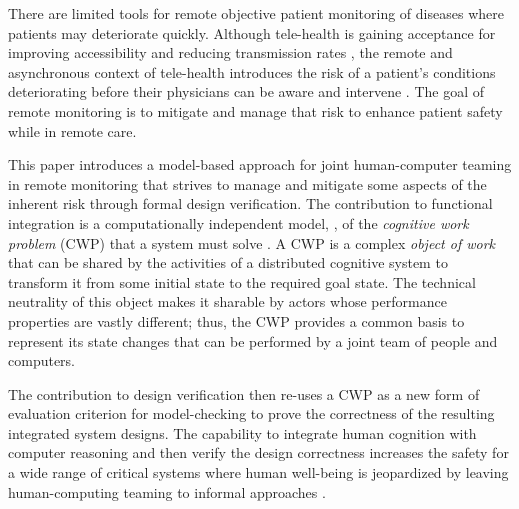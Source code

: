 There are limited tools for remote objective patient monitoring of diseases where patients may deteriorate quickly. Although tele-health is gaining acceptance for improving accessibility and reducing transmission rates \cite{10.1093/jamia/ocaa048,telehealth,10.1093/jamia/ocaa067}, the remote and asynchronous context of tele-health introduces the risk of a patient's conditions deteriorating before their physicians can be aware and intervene \cite{10.1097/ALN.0000000000003578}. The goal of remote monitoring is to mitigate and manage that risk to enhance patient safety while in remote care. 

\begin{comment}
  Remote patient monitoring relies on clinicians, health IT, patients-caregivers, and other concurrent actors to each reliably perform various asynchronous tasks to coordinate patient care and safety \cite{remote,Aalam229}. Designing such systems becomes complex quickly because actors are outside the direct control of the system. These distributed and asynchronous characteristics make manual reasoning about functional integration and safety early in the design process very difficult; and yet, early in the design process is exactly the time to clearly establish the utility of the design in fulfilling its intended purpose. 
\end{comment}

This paper introduces a model-based approach for joint human-computer teaming in remote monitoring 
that strives to manage and mitigate some aspects of the inherent risk through formal design verification. The contribution to functional integration is a computationally independent model, \cite{garrido}, of the \emph{cognitive work problem} (CWP) that a system must solve \cite{workflowmodel,workcentered,BERRY201615,chi2010}.  A CWP is a complex \emph{object of work} that can be shared by the activities of a distributed cognitive system to transform it from some initial state to the required goal state. The technical neutrality of this object makes it sharable by actors whose performance properties are vastly different; thus, the CWP provides a common basis to represent its state changes that can be performed by a joint team of people and computers. 

The contribution to design verification then re-uses a CWP as a new form of evaluation criterion for model-checking to prove the correctness of the resulting integrated system designs. The capability to integrate human cognition with computer reasoning and then verify the design correctness increases the safety for a wide range of critical systems where human well-being is jeopardized by leaving human-computing teaming to informal approaches \cite{remote,Aalam229}.

